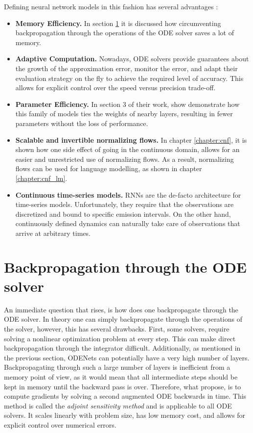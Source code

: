 Defining neural network models in this fashion has several advantages \cite{chen2018neural}:

\begin{itemize}
    \item \textbf{Memory Efficiency.} In section \ref{section:ode:backpropagation} it is discussed how circumventing backpropagation through the operations of the ODE solver saves a lot of memory.
    \item \textbf{Adaptive Computation.} Nowadays, ODE solvers provide guarantees about the growth of the approximation error, monitor the error, and adapt their evaluation strategy on the fly to achieve the required level of accuracy. This allows for explicit control over the speed versus precision trade-off.
    \item \textbf{Parameter Efficiency.} In section 3 of their work, \citet{chen2018neural} show demonstrate how this family of models ties the weights of nearby layers, resulting in fewer parameters without the loss of performance.
    \item \textbf{Scalable and invertible normalizing flows.} In chapter \ref{chapter:cnf}, it is shown how one side effect of going in the continuous domain, allows for an easier and unrestricted use of normalizing flows. As a result, normalizing flows can be used for language modelling, as shown in chapter \ref{chapter:cnf_lm}.
    \item \textbf{Continuous time-series models.} RNNs are the de-facto architecture for time-series models. Unfortunately, they require that the observations are discretized and bound to specific emission intervals. On the other hand, continuously defined dynamics can naturally take care of observations that arrive at arbitrary times.
\end{itemize}

\section{Backpropagation through the ODE solver}
\label{section:ode:backpropagation}

An immediate question that rises, is how does one backpropagate through the ODE solver. In theory one can simply backpropagate through the operations of the solver, however, this has several drawbacks. First, some solvers, require solving a nonlinear optimization problem at every step. This can make direct backpropagation through the integrator difficult. Additionally, as mentioned in the previous section, ODENets can potentially have a very high number of layers. Backpropagating through such a large number of layers is inefficient from a memory point of view, as it would mean that all intermediate steps should be kept in memory until the backward pass is over. Therefore, what \citet{chen2018neural} propose, is to compute gradients by solving a second augmented ODE backwards in time. This method is called the \emph{adjoint sensitivity method} \citep{pontryagin2018mathematical} and is applicable to all ODE solvers. It scales linearly with problem size, has low memory cost, and allows for explicit control over numerical errors.

